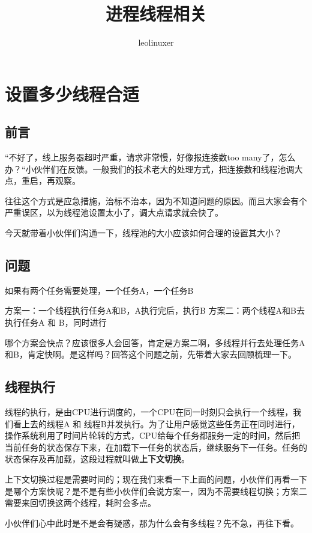 \documentclass[12pt]{article}
\title{进程线程相关}
\author{leolinuxer}
\begin{document}
\maketitle
\tableofcontents

\section{设置多少线程合适\cite{Multi_Thread_How_Many}}
\subsection{前言}
“不好了，线上服务器超时严重，请求非常慢，好像报连接数too many了，怎么办？“小伙伴们在反馈。一般我们的技术老大的处理方式，把连接数和线程池调大点，重启，再观察。

往往这个方式是应急措施，治标不治本，因为不知道问题的原因。而且大家会有个严重误区，以为线程池设置太小了，调大点请求就会快了。

今天就带着小伙伴们沟通一下，线程池的大小应该如何合理的设置其大小？

\subsection{问题}
如果有两个任务需要处理，一个任务A，一个任务B

方案一：一个线程执行任务A和B，A执行完后，执行B 方案二：两个线程A和B去执行任务A 和 B，同时进行

哪个方案会快点？应该很多人会回答，肯定是方案二啊，多线程并行去处理任务A和B，肯定快啊。是这样吗？回答这个问题之前，先带着大家去回顾梳理一下。

\subsection{线程执行}
线程的执行，是由CPU进行调度的，一个CPU在同一时刻只会执行一个线程，我们看上去的线程A 和 线程B并发执行。为了让用户感觉这些任务正在同时进行，操作系统利用了时间片轮转的方式，CPU给每个任务都服务一定的时间，然后把当前任务的状态保存下来，在加载下一任务的状态后，继续服务下一任务。任务的状态保存及再加载，这段过程就叫做\textbf{上下文切换}。

上下文切换过程是需要时间的；现在我们来看一下上面的问题，小伙伴们再看一下是哪个方案快呢？是不是有些小伙伴们会说方案一，因为不需要线程切换；方案二需要来回切换这两个线程，耗时会多点。

小伙伴们心中此时是不是会有疑惑，那为什么会有多线程？先不急，再往下看。
\end{document}
